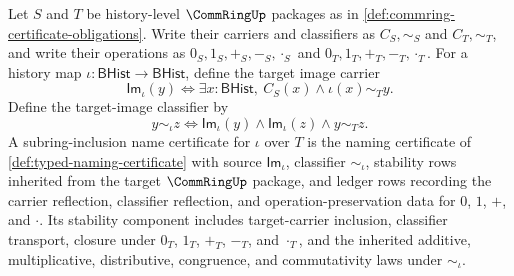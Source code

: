 \begin{definition}
\label{def:commring-subring-inclusion-name-certificate}
Let $S$ and $T$ be history-level $\CommRingUp$ packages as in \autoref{def:commring-certificate-obligations}. Write their carriers and classifiers as $C_S,\sim_S$ and $C_T,\sim_T$, and write their operations as $0_S,1_S,+_S,-_S,\cdot_S$ and $0_T,1_T,+_T,-_T,\cdot_T$. For a history map $\iota:\mathsf{BHist}\to\mathsf{BHist}$, define the target image carrier
$$
\mathsf{Im}_{\iota}(y)\Longleftrightarrow \exists x:\mathsf{BHist},\ C_S(x)\land \iota(x)\sim_T y.
$$
Define the target-image classifier by
$$
y\sim_{\iota} z\Longleftrightarrow \mathsf{Im}_{\iota}(y)\land\mathsf{Im}_{\iota}(z)\land y\sim_T z.
$$
A subring-inclusion name certificate for $\iota$ over $T$ is the naming certificate of \autoref{def:typed-naming-certificate} with source $\mathsf{Im}_{\iota}$, classifier $\sim_{\iota}$, stability rows inherited from the target $\CommRingUp$ package, and ledger rows recording the carrier reflection, classifier reflection, and operation-preservation data for $0$, $1$, $+$, and $\cdot$. Its stability component includes target-carrier inclusion, classifier transport, closure under $0_T$, $1_T$, $+_T$, $-_T$, and $\cdot_T$, and the inherited additive, multiplicative, distributive, congruence, and commutativity laws under $\sim_{\iota}$.
\end{definition}

